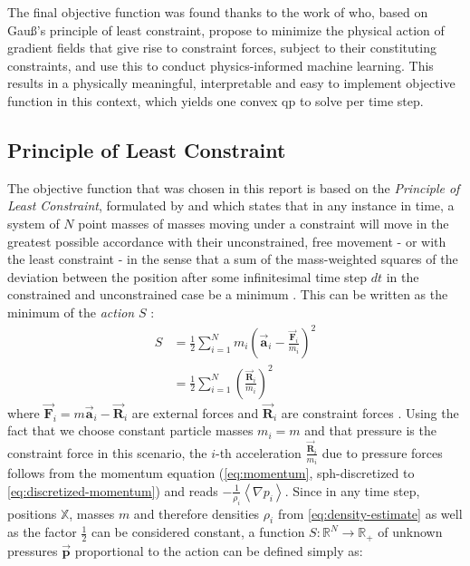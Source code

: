 \documentclass[conference]{IEEEtran}
\newcommand\vek[1]{\vec{\bm{#1}}}
\newcommand\mat[1]{{\mathds{#1}}}
\newcommand\br[1]{\left(#1\right)}
\newcommand\abr[1]{\left\langle#1\right\rangle}
\begin{document}
The final objective function was found thanks to the work of \autocite[Alhussein and Daqaq]{pmpg} who, based on Gau\ss's principle of least constraint, propose to minimize the physical action of gradient fields that give rise to constraint forces, subject to their constituting constraints, and use this to conduct physics-informed machine learning. This results in a physically meaningful, interpretable and easy to implement objective function in this context, which yields one convex \ac{qp} to solve per time step.

\subsection{Principle of Least Constraint}\label{sec:least-pressure-gradient}
The objective function that was chosen in this report is based on the \emph{Principle of Least Constraint}, formulated by \autocite[Carl Friedrich Gau\ss]{Gauss-least-action} and which states that in any instance in time, a system of $N$ point masses of masses moving under a constraint will move in the greatest possible accordance with their unconstrained, free movement - or with the least constraint - in the sense that a sum of the mass-weighted squares of the deviation between the position after some infinitesimal time step $dt$ in the constrained and unconstrained case be a minimum \cite{Gauss-least-action}. This can be written as the minimum of the \emph{action} $S$ \cite{pmpg}:
\begin{align}
  S &=\frac{1}{2} \sum_{i=1}^{N} m_i \br{\vek{a}_i - \frac{\vek{F}_i}{m_i}}^2\\
  &= \frac{1}{2} \sum_{i=1}^{N} \br{\frac{\vek{R}_i}{m_i}}^2
\end{align}
where $\vek{F}_i = m\vek{a}_i - \vek{R}_i$ are external forces and $\vek{R}_i$ are constraint forces \cite{pmpg}. Using the fact that we choose constant particle masses $m_i = m$ and that pressure is the constraint force in this scenario, the $i$-th acceleration $\frac{\vek{R}_i}{m_i}$ due to pressure forces follows from the momentum equation (\autoref{eq:momentum}, \ac{sph}-discretized to \autoref{eq:discretized-momentum}) and reads $-\frac{1}{\rho_i} \abr{\nabla p_i}$. Since in any time step, positions $\mat{X}$, masses $m$ and therefore densities $\rho_i$ from \autoref{eq:density-estimate} as well as the factor $\frac{1}{2}$ can be considered constant, a function $S: \mathds{R}^N \to \mathds{R}_+$ of unknown pressures $\vek{p}$ proportional to the action can be defined simply as:
\end{document}
